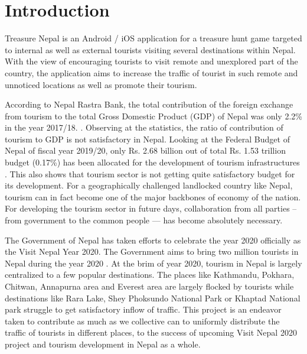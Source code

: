 \documentclass[12pt, a4paper, oneside]{article}
\begin{document}
\section{Introduction} 
Treasure Nepal is an Android / iOS application for a treasure hunt game targeted to internal as well as external tourists visiting several destinations within Nepal. With the view of encouraging tourists to visit remote and unexplored part of the country, the application aims to increase the traffic of tourist in such remote and unnoticed locations as well as promote their tourism. 

According to Nepal Rastra Bank, the total contribution of the foreign exchange from tourism to the total Gross Domestic Product (GDP) of Nepal was only 2.2\% in the year 2017/18. \cite{tourismstats}. Observing at the statistics, the ratio of contribution of tourism to GDP is not satisfactory in Nepal. Looking at the Federal Budget of Nepal of fiscal year 2019/20,  only Rs. 2.68 billion out of total Rs. 1.53 trillion budget (0.17\%) has been allocated for the development of tourism infrastructures \cite{budget}. This also shows that tourism sector is not getting quite satisfactory budget for its development. For a geographically challenged landlocked country like Nepal, tourism can in fact become one of the major backbones of economy of the nation. For developing the tourism sector in future days, collaboration from all parties -- from government to the common people --- has become absolutely necessary. 

The Government of Nepal has taken efforts to celebrate the year 2020 officially as the Visit Nepal Year 2020. The Government aims to bring two million tourists in Nepal during the year 2020 \cite{visitnepal}. At the brim of year 2020, tourism in Nepal is largely centralized to a few popular destinations. The places like Kathmandu, Pokhara, Chitwan, Annapurna area and Everest area are largely flocked by tourists while destinations like Rara Lake, Shey Phoksundo National Park or Khaptad National park struggle to get satisfactory inflow of traffic. This project is an endeavor taken to contribute as much as we collective can to uniformly distribute the traffic of tourists in different places, to the success of upcoming Visit Nepal 2020 project and tourism development in Nepal as a whole.
\end{document}
